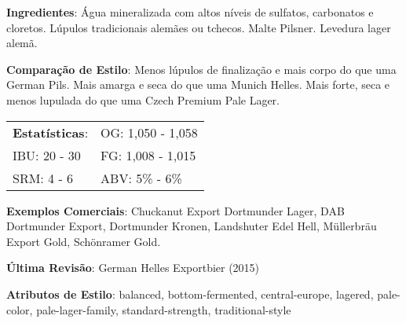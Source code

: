 \textbf{Ingredientes}: Água mineralizada com altos níveis de sulfatos, carbonatos e cloretos. Lúpulos tradicionais alemães ou tchecos. Malte Pilsner. Levedura lager alemã.

\textbf{Comparação de Estilo}: Menos lúpulos de finalização e mais corpo do que uma German Pils. Mais amarga e seca do que uma Munich Helles. Mais forte, seca e menos lupulada do que uma Czech Premium Pale Lager.

\begin{tabular}{@{}p{35mm}p{35mm}@{}}
  \textbf{Estatísticas}: & OG: 1,050 - 1,058 \\
  IBU: 20 - 30  & FG: 1,008 - 1,015  \\
  SRM: 4 - 6  & ABV: 5\% - 6\%
\end{tabular}

\textbf{Exemplos Comerciais}: Chuckanut Export Dortmunder Lager, DAB Dortmunder Export, Dortmunder Kronen, Landshuter Edel Hell, Müllerbräu Export Gold, Schönramer Gold.

\textbf{Última Revisão}: German Helles Exportbier (2015)

\textbf{Atributos de Estilo}: balanced, bottom-fermented, central-europe, lagered, pale-color, pale-lager-family, standard-strength, traditional-style
